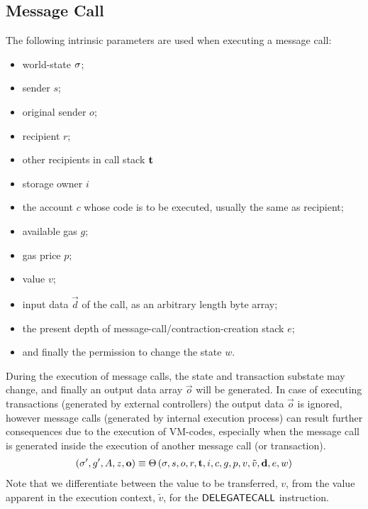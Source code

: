 

\subsection{Message Call}\label{sec:execution}
The following intrinsic parameters are used when executing a message call:
\begin{itemize}[nosep]
	\item world-state ${\mathbf{\sigma}}$;
	
	\item sender $s$;

	\item original sender $o$;

	\item recipient $r$;
	
	\item other recipients in call stack ${\bf t}$
	
	\item storage owner $i$

	\item the account $c$ whose code is to be executed, usually the same as recipient; 

	\item available gas $g$;

	\item gas price $p$;

	\item value $v$;

	\item input data $\vec{d}$ of the call, as an arbitrary length byte array;

	\item the present depth of message-call/contraction-creation stack $e$;

	\item and finally the permission to change the state $w$.
\end{itemize}

During the execution of message calls, 
the state and transaction substate may change,
and finally an output data array $\vec{o}$ will be generated.
In case of executing transactions (generated by external controllers) the output data $\vec{o}$ is ignored, however message calls (generated by internal execution process) can result further consequences due to the execution of VM-codes, especially when the message call is generated inside the execution of another message call (or transaction).
\begin{align}
  	\left(\mathbf{\sigma}', g', A, z, \mathbf{o} \right) \equiv \mathrm{\Theta}\left(\mathbf{\sigma},s,o,r,\mathbf{t},i,c,g, p,v,\tilde{v},\mathbf{d},e,w \right)
\end{align}  
Note that we differentiate between the value to be transferred, $v$, from the value apparent in the execution context, $\tilde{v}$, for the $\mathsf{DELEGATECALL}$ instruction.

